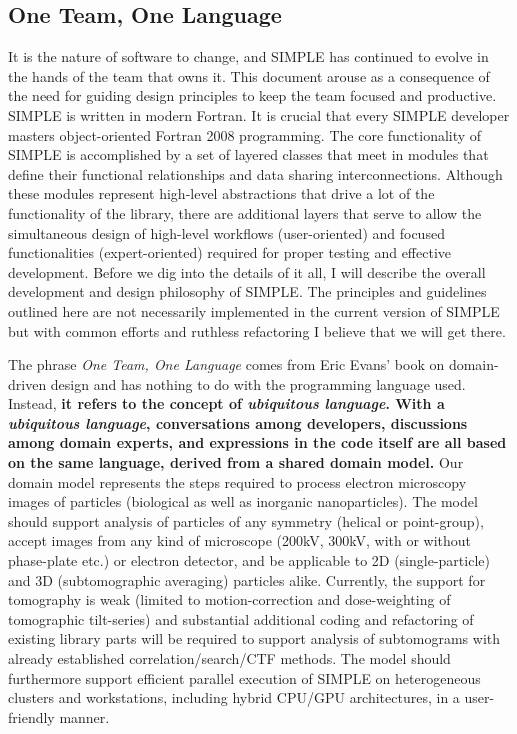 \documentclass[a4paper,11pt]{article}
\begin{document}
\subsection{One Team, One Language}
It is the nature of software to change, and SIMPLE has continued to evolve in the hands of the team that owns it. This document arouse as a consequence of the need for guiding design principles to keep the team focused and productive. SIMPLE is written in modern Fortran. It is crucial that every SIMPLE developer masters object-oriented Fortran 2008 programming. The core functionality of SIMPLE is accomplished by a set of layered classes that meet in modules that define their functional relationships and data sharing interconnections. Although these modules represent high-level abstractions that drive a lot of the functionality of the library, there are additional layers that serve to allow the simultaneous design of high-level workflows (user-oriented) and focused functionalities (expert-oriented) required for proper testing and effective development. Before we dig into the details of it all, I will describe the overall development and design philosophy of SIMPLE. The principles and guidelines outlined here are not necessarily implemented in the current version of SIMPLE but with common efforts and ruthless refactoring I believe that we will get there.

The phrase \textit{One Team, One Language} comes from Eric Evans' book on domain-driven design and has nothing to do with the programming language used. Instead, \textbf{it refers to the concept of \textit{ubiquitous language}. With a \textit{ubiquitous language}, conversations among developers, discussions among domain experts, and expressions in the code itself are all based on the same language, derived from a shared domain model.} Our domain model represents the steps required to process electron microscopy images of particles (biological as well as inorganic nanoparticles). The model should support analysis of particles of any symmetry (helical or point-group), accept images from any kind of microscope (200kV, 300kV, with or without phase-plate etc.) or electron detector, and be applicable to 2D (single-particle) and 3D (subtomographic averaging) particles alike. Currently, the support for tomography is weak (limited to motion-correction and dose-weighting of tomographic tilt-series) and substantial additional coding and refactoring of existing library parts will be required to support analysis of subtomograms with already established correlation/search/CTF methods. The model should furthermore support efficient parallel execution of SIMPLE on heterogeneous clusters and workstations, including hybrid CPU/GPU architectures, in a user-friendly manner.
\end{document}
